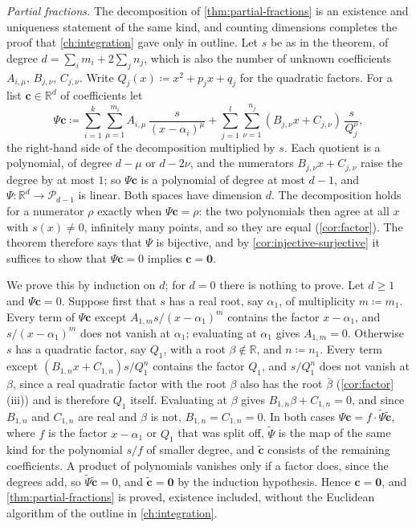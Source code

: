 \emph{Partial fractions.} The decomposition of \cref{thm:partial-fractions} is an existence and uniqueness statement of the same kind, and counting dimensions completes the proof that \cref{ch:integration} gave only in outline. Let $s$ be as in the theorem, of degree $d=\sum_im_i+2\sum_jn_j$, which is also the number of unknown coefficients $A_{i,\mu}$, $B_{j,\nu}$, $C_{j,\nu}$. Write $Q_j(x)\coloneqq x^2+p_jx+q_j$ for the quadratic factors. For a list $\mathbf c\in\mathbb R^d$ of coefficients let
\[
\Psi\mathbf c\coloneqq\sum_{i=1}^k\sum_{\mu=1}^{m_i}A_{i,\mu}\,\frac{s}{(x-\alpha_i)^\mu}+\sum_{j=1}^l\sum_{\nu=1}^{n_j}(B_{j,\nu}x+C_{j,\nu})\,\frac{s}{Q_j^\nu},
\]
the right-hand side of the decomposition multiplied by $s$. Each quotient is a polynomial, of degree $d-\mu$ or $d-2\nu$, and the numerators $B_{j,\nu}x+C_{j,\nu}$ raise the degree by at most $1$; so $\Psi\mathbf c$ is a polynomial of degree at most $d-1$, and $\Psi\colon\mathbb R^d\to\mathcal P_{d-1}$ is linear. Both spaces have dimension $d$. The decomposition holds for a numerator $\rho$ exactly when $\Psi\mathbf c=\rho$: the two polynomials then agree at all $x$ with $s(x)\ne0$, infinitely many points, and so they are equal (\cref{cor:factor}). The theorem therefore says that $\Psi$ is bijective, and by \cref{cor:injective-surjective} it suffices to show that $\Psi\mathbf c=0$ implies $\mathbf c=\mathbf 0$.

We prove this by induction on $d$; for $d=0$ there is nothing to prove. Let $d\ge1$ and $\Psi\mathbf c=0$. Suppose first that $s$ has a real root, say $\alpha_1$, of multiplicity $m\coloneqq m_1$. Every term of $\Psi\mathbf c$ except $A_{1,m}s/(x-\alpha_1)^m$ contains the factor $x-\alpha_1$, and $s/(x-\alpha_1)^m$ does not vanish at $\alpha_1$; evaluating at $\alpha_1$ gives $A_{1,m}=0$. Otherwise $s$ has a quadratic factor, say $Q_1$, with a root $\beta\notin\mathbb R$, and $n\coloneqq n_1$. Every term except $(B_{1,n}x+C_{1,n})s/Q_1^n$ contains the factor $Q_1$, and $s/Q_1^n$ does not vanish at $\beta$, since a real quadratic factor with the root $\beta$ also has the root $\bar\beta$ (\cref{cor:factor}\,(iii)) and is therefore $Q_1$ itself. Evaluating at $\beta$ gives $B_{1,n}\beta+C_{1,n}=0$, and since $B_{1,n}$ and $C_{1,n}$ are real and $\beta$ is not, $B_{1,n}=C_{1,n}=0$. In both cases $\Psi\mathbf c=f\cdot\tilde\Psi\tilde{\mathbf c}$, where $f$ is the factor $x-\alpha_1$ or $Q_1$ that was split off, $\tilde\Psi$ is the map of the same kind for the polynomial $s/f$ of smaller degree, and $\tilde{\mathbf c}$ consists of the remaining coefficients. A product of polynomials vanishes only if a factor does, since the degrees add, so $\tilde\Psi\tilde{\mathbf c}=0$, and $\tilde{\mathbf c}=\mathbf 0$ by the induction hypothesis. Hence $\mathbf c=\mathbf 0$, and \cref{thm:partial-fractions} is proved, existence included, without the Euclidean algorithm of the outline in \cref{ch:integration}.

